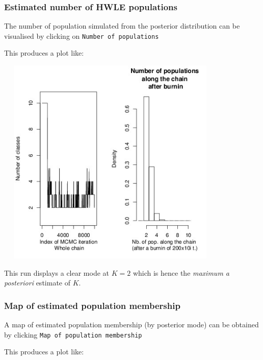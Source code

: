 \documentclass[a4paper,10pt]{article}
\begin{document}
\bigskip

\clearpage
\subsubsection{Estimated number  of HWLE populations}
The number of population simulated from the posterior distribution can be visualised by clicking on \texttt{Number of populations}


This produces a plot like:\\

\centerline{\includegraphics[height=10cm,width=11cm]{./fig/npop.jpeg}}

This run displays a clear mode at $K=2$ which is hence the {\em maximum a posteriori} estimate of $K$.

\clearpage
\subsubsection{Map of estimated  population membership}
A map of estimated  population membership (by posterior mode) can be obtained by clicking \texttt{Map of population membership}


This produces a plot like:\\
\end{document}
